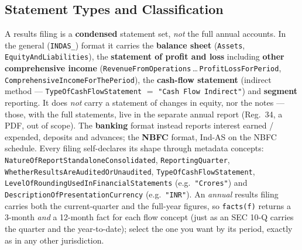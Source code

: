 \documentclass[11pt,a4paper]{report}
\begin{document}
\subsection{Statement Types and Classification}\label{sec:india-statements}\label{sec:india-classify}
A results filing is a \textbf{condensed} statement set, \emph{not} the full annual accounts. In the general
(\texttt{INDAS\_}) format it carries the \textbf{balance sheet} (\texttt{Assets},
\texttt{EquityAndLiabilities}), the \textbf{statement of profit and loss} including \textbf{other
comprehensive income} (\texttt{RevenueFromOperations}\,\ldots\,\texttt{ProfitLossForPeriod},
\texttt{ComprehensiveIncomeForThePeriod}), the \textbf{cash-flow statement} (indirect method ---
\texttt{TypeOfCashFlowStatement} $=$ \texttt{"Cash Flow Indirect"}) and \textbf{segment} reporting. It does
\emph{not} carry a statement of changes in equity, nor the notes --- those, with the full statements, live
in the separate annual report (Reg.~34, a PDF, out of scope). The \textbf{banking} format instead reports
interest earned / expended, deposits and advances; the \textbf{NBFC} format, Ind-AS on the NBFC schedule.
Every filing self-declares its shape through metadata concepts: \texttt{NatureOfReportStandaloneConsolidated},
\texttt{ReportingQuarter}, \texttt{WhetherResultsAreAuditedOrUnaudited}, \texttt{TypeOfCashFlowStatement},
\texttt{LevelOfRoundingUsedInFinancialStatements} (e.g.\ \texttt{"Crores"}) and
\texttt{DescriptionOfPresentationCurrency} (e.g.\ \texttt{"INR"}). An \emph{annual} results filing carries
both the current-quarter and the full-year figures, so \texttt{facts(f)} returns a 3-month \emph{and} a
12-month fact for each flow concept (just as an SEC 10-Q carries the quarter and the year-to-date); select
the one you want by its period, exactly as in any other jurisdiction.
\end{document}
